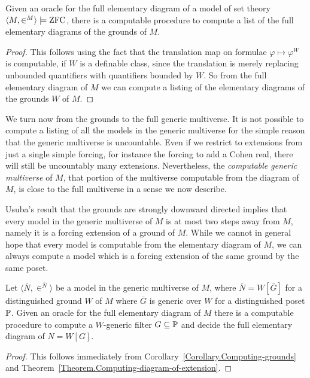 \documentclass{amsart}
\begin{document}
\begin{corollary}\label{Corollary.Computing-grounds}
Given an oracle for the full elementary diagram of a model of set theory $\<M,\in^M> \models \ZFC$, there is a computable procedure to compute a list of the full elementary diagrams of the grounds of $M$.
\end{corollary}

\begin{proof}
This follows using the fact that the translation map on formulae $\varphi \mapsto \varphi^W$ is computable, if $W$ is a definable class, since the translation is merely replacing unbounded quantifiers with quantifiers bounded by $W$. So from the full elementary diagram of $M$ we can compute a listing of the elementary diagrams of the grounds $W$ of $M$.
\end{proof}

We turn now from the grounds to the full generic multiverse. It is not possible to compute a listing of all the models in the generic multiverse for the simple reason that the generic multiverse is uncountable. Even if we restrict to extensions from just a single simple forcing, for instance the forcing to add a Cohen real, there will still be uncountably many extensions. Nevertheless, the \emph{computable generic multiverse} of $M$, that portion of the multiverse computable from the diagram of $M$, is close to the full multiverse in a sense we now describe.

Usuba's result that the grounds are strongly downward directed \cite{usuba2017} implies
that every model in the generic multiverse of $M$ is at most two steps away from $M$, namely it is a forcing extension of a ground of $M$. While we cannot in general hope that every model is computable from the elementary diagram of $M$, we can always compute a model which is a forcing extension of the same ground by the same poset.

\begin{corollary}\label{Corollary.Computing-the-generic-multiverse}
Let $\langle\bar N,\in^{\bar N}\rangle$ be a model in the generic multiverse of $M$, where $\bar N = W[\bar G]$ for a distinguished ground $W$ of $M$ where $\bar G$ is generic over $W$ for a distinguished poset $\P$. Given an oracle for the full elementary diagram of $M$ there is a computable procedure to compute a $W$-generic filter $G \subseteq \P$ and decide the full elementary diagram of $N = W[G]$.
\end{corollary}

\begin{proof}
This follows immediately from Corollary~\ref{Corollary.Computing-grounds} and Theorem~\ref{Theorem.Computing-diagram-of-extension}.
\end{proof}
\end{document}
